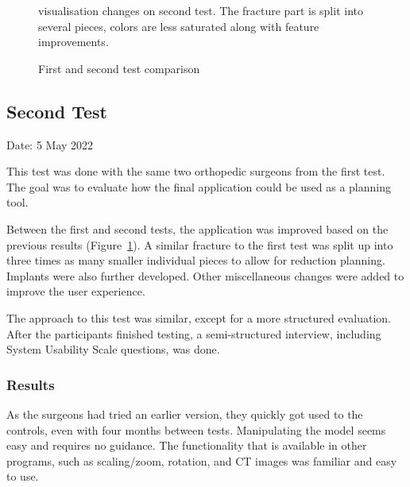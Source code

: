 \documentclass[a4paper]{report}
\begin{document}
\begin{figure}[h!]
    \centering
	\hfill
	\caption{First and second test comparison}\label{test}
  \small
  visualisation changes on second test. The fracture part is split into several pieces, colors are less saturated along with feature improvements.
\end{figure}

\subsection{Second Test}
Date: 5 May 2022

This test was done with the same two orthopedic surgeons from the first test.
The goal was to evaluate how the final application could be used as a planning tool.

Between the first and second tests, the application was improved based on the previous results (Figure~\ref{test}).
A similar fracture to the first test was split up into three times as many smaller individual pieces to allow for reduction planning.
Implants were also further developed.
Other miscellaneous changes were added to improve the user experience.

The approach to this test was similar, except for a more structured evaluation. After the participants finished testing, a semi-structured interview, including System Usability Scale questions, was done.


\subsubsection{Results}
As the surgeons had tried an earlier version, they quickly got used to the controls, even with four months between tests. 
Manipulating the model seems easy and requires no guidance. The functionality that is available in other programs, such as scaling/zoom, rotation, and CT images was familiar and easy to use.
\end{document}

